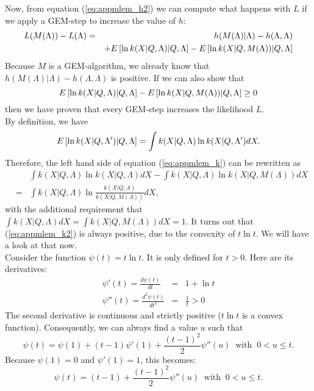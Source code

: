 Now, from equation (\ref{eq:appmlem_h2}) we can compute what happens with $L$
if we apply a GEM-step to increase the value of $h$:
\begin{eqnarray}
  L(M(\Lambda)) - L(\Lambda) & = &
  h(M(\Lambda) | \Lambda) - h(\Lambda, \Lambda) \nonumber \\
  & &  + E\left[{\ln k(X | Q, \Lambda) | Q,\Lambda}\right] 
       - E\left[{\ln k(X | Q, M(\Lambda)) | Q,\Lambda}\right] \label{eq:appmlem_l}
\end{eqnarray}
Because $M$ is a GEM-algorithm, we already know that $h(M(\Lambda) | \Lambda) -
h(\Lambda, \Lambda)$ is positive. If we can also show that
\begin{equation}
  E\left[{\ln k(X | Q, \Lambda) | Q,\Lambda}\right] 
   - E\left[{\ln k(X | Q, M(\Lambda)) | Q,\Lambda}\right] \geq 0 \label{eq:appmlem_k}
\end{equation}
then we have proven that every GEM-step increases the likelihood $L$.\\[3mm]

By definition, we have
\begin{equation}
  E\left[{\ln k(X | Q, \Lambda') | Q,\Lambda}\right] =
     \int k(X | Q, \Lambda) \ln k(X | Q, \Lambda') dX.
\end{equation}
Therefore, the left hand side of equation (\ref{eq:appmlem_k}) can be
rewritten as
\begin{eqnarray}
& &  \int k(X | Q, \Lambda) \ln k(X | Q, \Lambda) dX 
  - \int k(X | Q, \Lambda) \ln k(X | Q, M(\Lambda)) dX \\
& = & \int k(X | Q, \Lambda)
        \ln \frac{k(X | Q, \Lambda)}{k(X | Q, M(\Lambda))} dX, 
        \label{eq:appmlem_k2}
\end{eqnarray}
with the additional requirement that $\int k(X | Q, \Lambda) dX = \int k(X |
Q, M(\Lambda)) dX = 1$. It turns out that (\ref{eq:appmlem_k2}) is always
positive, due to the convexity of $t \ln t$. We will have a look at that
now.\\[3mm]

Consider the function $\psi(t) = t \ln t$. It is only defined for $t >
0$. Here are its derivatives:
\begin{eqnarray}
  \psi'(t) = \frac{d \psi(t)}{dt} & = & 1 + \ln t\\
  \psi''(t) = \frac{d^2 \psi(t)}{dt^2} & = & \frac{1}{t} > 0
\end{eqnarray}
The second derivative is continuous and strictly positive ($t \ln t$ is a
convex function). Consequently, we can always find a value $u$ such that
\begin{equation}
  \psi(t) = \psi(1) + (t - 1) \psi'(1) + \frac{(t-1)^2}{2} \psi''(u) 
       \;\; \mbox{with} \;\; 0 < u \leq t.
\end{equation}
Because $\psi(1) = 0$ and $\psi'(1) = 1$, this becomes:
\begin{equation}
  \psi(t) = (t - 1) + \frac{(t-1)^2}{2} \psi''(u) 
       \;\; \mbox{with} \;\; 0 < u \leq t.
\end{equation}

